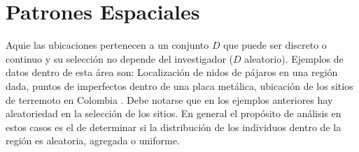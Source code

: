 \section{Patrones Espaciales}

Aquie las ubicaciones pertenecen a un conjunto $D$ que puede ser
discreto o continuo y su selección no depende del investigador ($D$ aleatorio). Ejemplos de datos dentro de esta área son: Localización de nidos de pájaros en una región dada, puntos de imperfectos dentro de una placa metálica, ubicación de los sitios de terremoto en Colombia . Debe notarse
que en los ejemplos anteriores hay aleatoriedad en la selección de los sitios. En general el propósito de análisis
en estos casos es el de determinar si la distribución de los individuos dentro de la región es
aleatoria, agregada o uniforme.